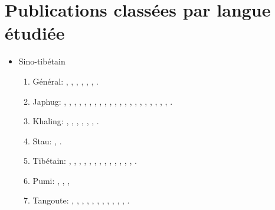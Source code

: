 \documentclass[oneside,a4paper,11pt]{article}
\newcommand{\langue}[2]{#2}
\begin{document}
\section{\langue{By languages}{Publications classées par langue étudiée}}
\begin{itemize}
\item \langue{Sino-Tibetan}{Sino-tibétain}
\begin{enumerate}
\item \langue{General}{Général}: \citet{jacques03s.houzhui}, \citet{jacques06morpho}, \citet{jacques07chang}, \citet{antonov12kumush}, \citet{jacques12agreement},    \citet{michaud-jacques12nasalite}, \citet{jacques16th}.     
\item Japhug:  \citet{jacques04redupl},     \citet{jacques04these},   \citet{jacques07passif},  \citet{jacques07redupl}, \citet{jacques08},  \citet{jacques10gesar}, \citet{jacques10refl},  \citet{jacques10inverse},  \citet{jacques12incorp},   \citet{jacques12demotion},  \citet{jacques13harmonization},  \citet{jacques13tropative}, \citet{jacques14antipassive}, \citet{japhug14ideophones}, \citet{jacques14inverse}, \citet{jacques14linking}, \citet{jacques16comparative}, \citet{jacques15causative}, \citet{jacques15japhug}, \citet{jacques16relatives}, \citet{jacques17sketch}, \citet{jacques15generic}.
\item Khaling: \citet{jacques12khaling},  \citet{jacques13derivational.khaling}, \citet{jacques14auditory}, \citet{jacques15derivational.khaling}, \citet{jacques15khaling},  \citet{jacques16si}, \citet{jacques16tonogenesis}.
\item Stau: \citet{antonov14rtau}, \citet{jacques14rtau}.
\item \langue{Tibetan}{Tibétain}:  \citet{jacques01dg}, \citet{jacques04thimphu}, \citet{jacques07naksatram},      \citet{jacques08debther},  \citet{jacques09wazur}, \citet{jacques09e},  \citet{jacques10zos},   \citet{jacques10ndr},  \citet{jacques11lingua},  \citet{jacques12internal},  \citet{jacques12transcription}, \citet{jacques13yod}, \citet{jacques14snom}, \citet{jacques14cone}.
\item Pumi:  \citet{michaud10bonin}, \citet{jacques11pumi.tone}, \citet{jacques11lingua}, 
\item \langue{Tangut}{Tangoute}: \citet{jacques06comparaison},  \citet{jacques07textes}, \citet{jacques08weiyu}, \citet{jacques08alternations},   \citet{jacques09tangutverb},  \citet{jacques10imperial},  \citet{jacques11tangut.verb}, \citet{jacques11ngwemi}, \citet{jacques11kinship},  \citet{jacques14esquisse}, \citet{jacques14ergative}, \citet{jacques16th}.

\end{enumerate}
\end{itemize}
\end{document}
